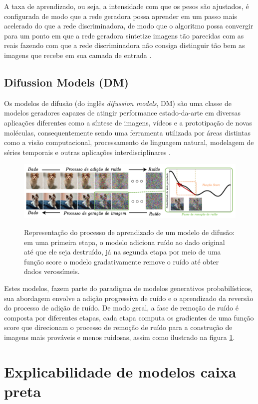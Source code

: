 A taxa de aprendizado, ou seja, a intensidade com que os pesos são ajustados, é configurada de modo que a rede geradora possa aprender em um passo mais acelerado do que a rede discriminadora, de modo que o algoritmo possa convergir para um ponto em que a rede geradora sintetize imagens tão parecidas com as reais fazendo com que a rede discriminadora não consiga distinguir tão bem as imagens que recebe em sua camada de entrada \cite{goodfellowGenerativeAdversarialNetworks2014}.



\subsection{Difussion Models (DM)}

Os modelos de difusão (do inglês \textit{difussion models}, DM) são uma classe de modelos geradores capazes de atingir performance estado-da-arte em diversas aplicações diferentes como a síntese de imagens, vídeos e a prototipação de novas moléculas, consequentemente sendo uma ferramenta utilizada por áreas distintas como a visão computacional, processamento de linguagem natural, modelagem de séries temporais e outras aplicações interdisciplinares \cite{yangDiffusionModelsComprehensive2023}.

\begin{figure}[htbp]
	\centering
	\caption{Representação do processo de aprendizado de um modelo de difusão: em uma primeira etapa, o modelo adiciona ruído ao dado original até que ele seja destruído, já na segunda etapa por meio de uma função score o modelo gradativamente remove o ruído até obter dados verossímeis.}
		\includegraphics[scale=.28]{imagens/difussion-model.png}
	\label{fig:diffusion-model}
\end{figure}

Estes modelos, fazem parte do paradigma de modelos generativos probabilísticos, sua abordagem envolve a adição progressiva de ruído e o aprendizado da reversão do processo de adição de ruído. De modo geral, a fase de remoção de ruído é composta por diferentes etapas, cada etapa computa os gradientes de uma função score que direcionam o processo de remoção de ruído para a construção de imagens mais prováveis e menos ruidosas, assim como ilustrado na figura \ref{fig:diffusion-model}.




\section{Explicabilidade de modelos caixa preta}